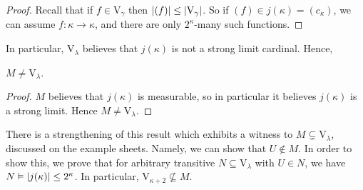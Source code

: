 \begin{proof}
    Recall that if \( f \in \mathrm{V}_\gamma \) then \( \abs{(f)} \leq \abs{\mathrm{V}_\gamma} \).
    So if \( (f) \in j(\kappa) = (c_\kappa) \), we can assume \( f : \kappa \to \kappa \), and there are only \( 2^\kappa \)-many such functions.
\end{proof}
In particular, \( \mathrm{V}_\lambda \) believes that \( j(\kappa) \) is not a strong limit cardinal.
Hence,
\begin{lemma}
    \( M \neq \mathrm{V}_\lambda \).
\end{lemma}
\begin{proof}
    \( M \) believes that \( j(\kappa) \) is measurable, so in particular it believes \( j(\kappa) \) is a strong limit.
    Hence \( M \neq \mathrm{V}_\lambda \).
\end{proof}
There is a strengthening of this result which exhibits a witness to \( M \subsetneq \mathrm{V}_\lambda \), discussed on the example sheets.
Namely, we can show that \( U \notin M \).
In order to show this, we prove that for arbitrary transitive \( N \subseteq \mathrm{V}_\lambda \) with \( U \in N \), we have \( N \vDash \abs{j(\kappa)} \leq 2^\kappa \).
In particular, \( \mathrm{V}_{\kappa + 2} \nsubseteq M \).
